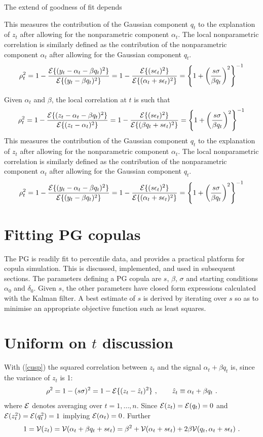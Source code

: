 \documentclass[authoryear]{elsarticle}
\newcommand{\eps}{\epsilon}
\newcommand{\Ex}{{\cal E}}
\newcommand{\eref}[1]{(\ref{#1})}
\newcommand{\cq}{\ , \qquad}
\newcommand{\Vx}{{\cal V}}
\begin{document}
   The extend of goodness of fit depends 


This measures the contribution of the Gaussian component $q_t$ to the explanation of $z_t$ after allowing for the nonparametric component $\alpha_t$.    The local nonparametric correlation is similarly defined as the contribution of the nonparametric component $\alpha_t$ after allowing for the Gaussian component $q_t$.
$$
\rho_t^2=1-\frac{\Ex\{(y_t-\alpha_t-\beta q_t)^2\}}{\Ex\{(y_t-\beta q_t)^2\}} =  1-\frac{\Ex\{(s\eps_t)^2\}}{\Ex\{(\alpha_t+s\eps_t)^2\}} = \left\{1+\left(\frac{s\sigma}{\beta q_t}\right)^2\right\}^{-1}
$$

Given $\alpha_t$ and $\beta$, the local  correlation at $t$ is such that
$$
\rho_t^2=1-\frac{\Ex\{(z_t-\alpha_t-\beta q_t)^2\}}{\Ex\{(z_t-\alpha_t)^2\}} =  1-\frac{\Ex\{(s\eps_t)^2\}}{\Ex\{(\beta q_t+s\eps_t)^2\}} = \left\{1+\left(\frac{s\sigma}{\beta q_t}\right)^2\right\}^{-1}
$$
This measures the contribution of the Gaussian component $q_t$ to the explanation of $z_t$ after allowing for the nonparametric component $\alpha_t$.    The local nonparametric correlation is similarly defined as the contribution of the nonparametric component $\alpha_t$ after allowing for the Gaussian component $q_t$.
$$
\rho_t^2=1-\frac{\Ex\{(y_t-\alpha_t-\beta q_t)^2\}}{\Ex\{(y_t-\beta q_t)^2\}} =  1-\frac{\Ex\{(s\eps_t)^2\}}{\Ex\{(\alpha_t+s\eps_t)^2\}} = \left\{1+\left(\frac{s\sigma}{\beta q_t}\right)^2\right\}^{-1}
$$


\section{Fitting PG copulas}
 The PG is readily  fit to percentile data, and provides a practical platform for copula simulation.  This is discussed, implemented, and used in subsequent sections.  The  parameters defining a PG copula are $s$, $\beta$,  $\sigma$ and starting conditions $\alpha_0$ and $\delta_0$.  Given $s$, the other parameters have  closed form expressions calculated with the Kalman filter.  A best estimate of $s$ is derived by iterating over $s$ so as to minimise  an appropriate objective function such as least squares. 

\section{Uniform on $t$ discussion}

With \eref{cusp} the squared correlation between $z_t$ and the signal $\alpha_t+\beta q_t$ is, since the variance of $z_t$ is 1:
 $$
 \rho^2=1-(s\sigma)^2 = 1- \Ex\{(z_t-\hat z_t)^2\}\cq \hat z_t\equiv\alpha_t+\beta q_t\ .
 $$
 where $\Ex$ denotes averaging over $t=1,\ldots,n$.  Since $\Ex(z_t)=\Ex(q_t)=0$ and $\Ex(z_t^2)=\Ex(q_t^2)=1$ implying
 $\Ex(\alpha_t)=0$.  Further
 $$
 1=\Vx(z_t) = \Vx(\alpha_t+\beta q_t + s\eps_t) = \beta^2 + \Vx(\alpha_t+s\eps_t) + 2\beta\Vx(q_t,\alpha_t+s\eps_t)\ .
 $$
 
\end{document}
